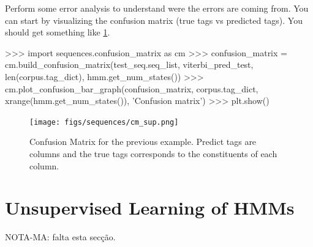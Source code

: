 \begin{exercise}
Perform some error analysis to understand were the errors are coming
from. You can start by visualizing the confusion matrix (true tags vs
predicted tags). You should get something like \ref{fig:cm_uns}.

\begin{python}
>>> import sequences.confusion_matrix as cm
>>> confusion_matrix = cm.build_confusion_matrix(test_seq.seq_list, viterbi_pred_test, len(corpus.tag_dict), hmm.get_num_states())
>>> cm.plot_confusion_bar_graph(confusion_matrix, corpus.tag_dict, xrange(hmm.get_num_states()), 'Confusion matrix')
>>> plt.show()
\end{python}

\begin{figure}
\centering
\texttt{[image: figs/sequences/cm\_sup.png]}
\caption{\label{fig:cm_uns} Confusion Matrix for the previous
  example. Predict tags are columns and the true tags corresponds to
  the constituents of each column.}
\end{figure}

\end{exercise}


%
%



\section{Unsupervised Learning of HMMs}

NOTA-MA: falta esta secção.


